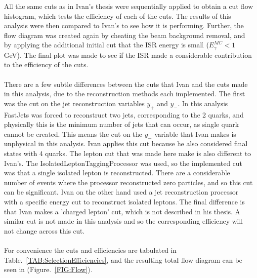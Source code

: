 All the same cuts as in Ivan’s thesis \cite{Marchesini:2011aka} were sequentially applied to obtain a cut flow histogram, which tests the efficiency of each of the cuts. The results of this analysis were then compared to Ivan's to see how it is performing. Further, the flow diagram was created again by cheating the beam background removal, and by applying the additional initial cut that the ISR energy is small (${E}_{\gamma}^{MC} < 1$ GeV). The final plot was made to see if the ISR made a considerable contribution to the efficiency of the cuts.
\\\\
There are a few subtle differences between the cuts that Ivan and the cuts made in this analysis, due to the reconstruction methods each implemented. The first was the cut on the jet reconstruction variables ${y}_{+}$ and ${y}_{-}$. In this analysis FastJets \cite{Cacciari:2011ma} was forced to reconstruct two jets, corresponding to the 2 quarks, and physically this is the minimum number of jets that can occur, as single quark cannot be created. This means the cut on the ${y}_{-}$ variable that Ivan makes is unphysical in this analysis. Ivan applies this cut because he also considered final states with 4 quarks. The lepton cut that was made here make is also different to Ivan’s. The IsolatedLeptonTaggingProcessor was used, so the implemented cut was that a single isolated lepton is reconstructed. There are a considerable number of events where the processor reconstructed zero particles, and so this cut can be significant. Ivan on the other hand used a jet reconstruction processor with a specific energy cut to reconstruct isolated leptons. The final difference is that Ivan makes a 'charged lepton' cut, which is not described in his thesis. A similar cut is not made in this analysis and so the corresponding efficiency will not change across this cut.
\\\\
For convenience the cuts and efficiencies are tabulated in Table.~\ref{TAB:SelectionEfficiencies}, and the resulting total flow diagram can be seen in (Figure.~\ref{FIG:Flow}).
\\\\
